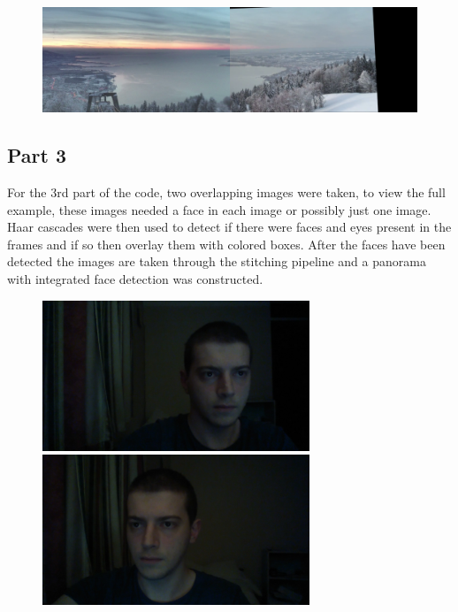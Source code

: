 \documentclass{article}
\begin{document}
\begin{figure}[H]
	\centering
	\includegraphics[width=14cm]{pano.png}
	
	
\end{figure}

\pagebreak
\subsection{Part 3}\label{sec:overview}

For the 3rd part of the code, two overlapping images were taken, to view the full example, these images needed a face in each image or possibly just one image.
Haar cascades were then used to detect if there were faces and eyes present in the frames and if so then overlay them with colored boxes. After the faces have been detected the images are taken through the stitching pipeline and a panorama with integrated face detection was constructed. 


\begin{figure}[H]
	\centering
	\includegraphics[width=8cm]{it1.jpg}
	\includegraphics[width=8cm]{it2.jpg}
	
\end{figure}
\end{document}
